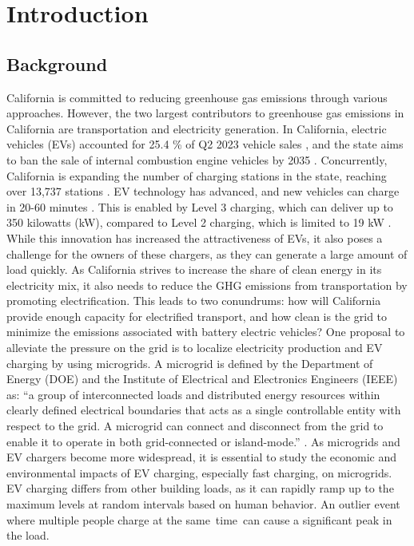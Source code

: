 \documentclass[conference]{IEEEtran}
\begin{document}
\section{Introduction}
    \subsection{Background}
		California is committed to reducing greenhouse gas emissions through various approaches. However, the two largest contributors to greenhouse gas emissions in California are transportation and electricity generation.  In California, electric vehicles (EVs) accounted for 25.4 \% of Q2 2023 vehicle sales \cite{ev_sale_percentage}, and the state aims to ban the sale of internal combustion engine vehicles by 2035 \cite{ice_ban}. Concurrently, California is expanding the number of charging stations in the state, reaching over 13,737 stations \cite{ev_stations_CA}. EV technology has advanced, and new vehicles can charge in 20-60 minutes \cite{ev_stats}. This is enabled by Level 3 charging, which can deliver up to 350 kilowatts (kW), compared to Level 2 charging, which is limited to 19 kW \cite{ev_stats}. While this innovation has increased the attractiveness of EVs, it also poses a challenge for the owners of these chargers, as they can generate a large amount of load quickly. As California strives to increase the share of clean energy in its electricity mix, it also needs to reduce the GHG emissions from transportation by promoting electrification. This leads to two conundrums: how will California provide enough capacity for electrified transport, and how clean is the grid to minimize the emissions associated with battery electric vehicles? One proposal to alleviate the pressure on the grid is to localize electricity production and EV charging by using microgrids. A microgrid is defined by the Department of Energy (DOE) and the Institute of Electrical and Electronics Engineers (IEEE) as: “a group of interconnected loads and distributed energy resources within clearly defined electrical boundaries that acts as a single controllable entity with respect to the grid. A microgrid can connect and disconnect from the grid to enable it to operate in both grid-connected or island-mode.” \cite{microgrid_def} \cite{microgrid_def_ieee}. As microgrids and EV chargers become more widespread, it is essential to study the economic and environmental impacts of EV charging, especially fast charging, on microgrids. EV charging differs from other building loads, as it can rapidly ramp up to the maximum levels at random intervals based on human behavior. An outlier event where multiple people charge at the same time can cause a significant peak in the load. \\
\end{document}

